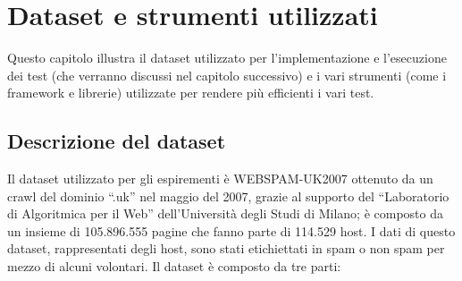 \chapter{Dataset e strumenti utilizzati}
Questo capitolo illustra il dataset utilizzato per l'implementazione e l'esecuzione dei test (che verranno discussi nel capitolo successivo) e i vari strumenti (come i framework e librerie) utilizzate per rendere più efficienti i vari test.
\section{Descrizione del dataset}
Il dataset utilizzato per gli espirementi è WEBSPAM-UK2007 \cite{webspam-uk2007} ottenuto da un crawl del dominio ``.uk'' nel maggio del 2007, grazie al supporto del ``Laboratorio di Algoritmica per il Web'' dell'Università degli Studi di Milano; è composto da un insieme di 105.896.555 pagine che fanno parte di 114.529 host. I dati di questo dataset, rappresentati degli host, sono stati etichiettati in spam o non spam per mezzo di alcuni volontari. Il dataset è composto da tre parti:
